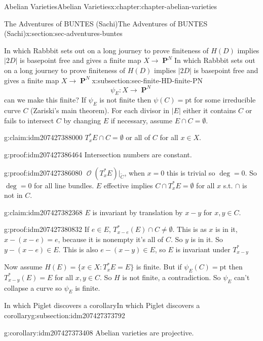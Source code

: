 \documentclass[oneside,10pt,]{book}
\numberwithin{equation}{section}
\newcommand{\sheaf}[1]{\operatorname{\mathcal{#1}}}
\DeclareMathOperator{\PP}{\mathbf{P}}
\begin{document}
\begin{chapterptx}{Abelian Varieties}{}{Abelian Varieties}{}{}{x:chapter:chapter-abelian-varieties}
\begin{sectionptx}{The Adventures of BUNTES (Sachi)}{}{The Adventures of BUNTES (Sachi)}{}{}{x:section:sec-adventures-buntes}
\begin{subsectionptx}{In which Rabbbit sets out on a long journey to prove finiteness of \(H(D)\) implies \(|2D|\) is basepoint free and gives a finite map \(X \to \PP^N\)}{}{In which Rabbbit sets out on a long journey to prove finiteness of \(H(D)\) implies \(|2D|\) is basepoint free and gives a finite map \(X \to \PP^N\)}{}{}{x:subsection:sec-finite-HD-finite-PN}
\begin{equation*}
\psi_E\colon X \to \PP^N
\end{equation*}
can we make this finite? If \(\psi_E\) is not finite then \(\psi(C) = \text{pt}\) for some irreducible curve \(C\) (Zariski's main theorem). For each divisor in \(|E|\) either it contains \(C\) or fails to intersect \(C\) by changing \(E\) if necessary, assume \(E \cap C = \emptyset\).%
\begin{claim}{}{}{g:claim:idm207427388000}%
\(T_x^*E\cap C= \emptyset\) or all of \(C\) for all \(x\in X\).%
\end{claim}
\begin{proofptx}{}{g:proof:idm207427386464}
Intersection numbers are constant.%
\end{proofptx}
\begin{proofptx}{}{g:proof:idm207427386080}
\(\sheaf O(T_x^*E)|_{\widetilde C}\), when \(x=0\) this is trivial so \(\deg =0\). So \(\deg = 0\) for all line bundles. \(E\) effective implies \(C\cap T_x^* E = \emptyset\) for all \(x\) s.t. \(\cap\) is not in \(C\).%
\end{proofptx}
\begin{claim}{}{}{g:claim:idm207427382368}%
\(E\) is invariant by translation by \(x - y\) for \(x,y \in C\).%
\end{claim}
\begin{proofptx}{}{g:proof:idm207427380832}
If \(e \in E\), \(T_{x-e}^*(E) \cap C \ne \emptyset\). This is as \(x\) is in it, \(x-(x-e) =e\), because it is nonempty it's all of \(C\). So \(y\) is in it. So \(y- (x-e) \in E\). This is also \(e - (x-y) \in E\), so \(E\) is invariant under \(T^*_{x-y}\)%
\end{proofptx}
Now assume \(H(E) = \{x\in X: T_x^*E  = E \}\) is finite. But if \(\psi_E(C) = \text{pt}\) then \(T_{x-y}^*(E)  = E\) for all \(x,y\in C\). So \(H\) is not finite, a contradiction. So \(\psi_E\) can't collapse a curve so \(\psi_E\) is finite.%
\end{subsectionptx}
%
%
\typeout{************************************************}
\typeout{************************************************}
%
\begin{subsectionptx}{In which Piglet discovers a corollary}{}{In which Piglet discovers a corollary}{}{}{g:subsection:idm207427373792}
\begin{corollary}{}{}{g:corollary:idm207427373408}%
Abelian varieties are projective.%
\end{corollary}

\end{subsectionptx}
\end{sectionptx}
\end{chapterptx}
\end{document}
